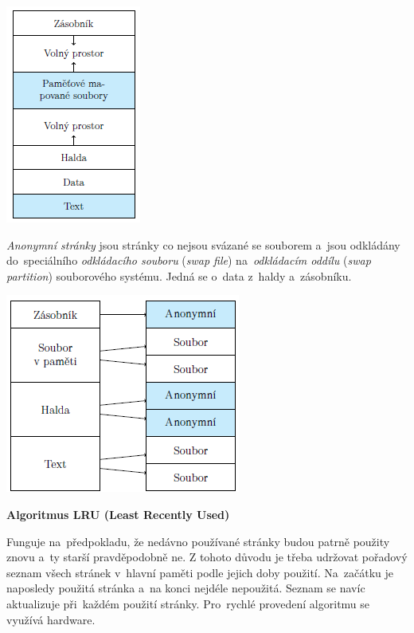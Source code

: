 \begin{center}
	\includegraphics[scale=1]{images/mem_page_file.png}
\end{center}

\emph{Anonymní stránky} jsou stránky co nejsou svázané se souborem a~jsou odkládány do~speciálního \emph{odkládacího souboru} (\emph{swap file}) na~\emph{odkládacím oddílu} (\emph{swap partition}) souborového systému. Jedná se o~data z~haldy a~zásobníku.

\begin{center}
	\includegraphics[scale=1]{images/mem_page_anon.png}
\end{center}

\begin{Large}
	\vspace{0,5cm}
	\textbf{Algoritmus LRU (Least Recently Used)}
\end{Large}

Funguje na~předpokladu, že nedávno používané stránky budou patrně použity znovu a~ty starší pravděpodobně ne. Z tohoto důvodu je třeba udržovat pořadový seznam všech stránek v~hlavní paměti podle jejich doby použití. Na~začátku je naposledy použitá stránka a~na konci nejdéle nepoužitá. Seznam se navíc aktualizuje při~každém použití stránky. Pro~rychlé provedení algoritmu se využívá hardware.

